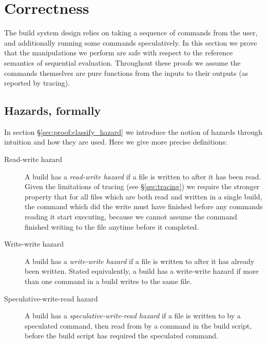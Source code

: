 
\renewcommand{\proof}{\vspace{1mm}\noindent \textbf{Proof}: }
\newcommand{\refutation}{\vspace{1mm}\noindent \textbf{Refutation}: }

\section{Correctness}
\label{sec:proof}

\newtheorem{claim}{Claim}

The build system design relies on taking a sequence of commands from the user, and additionally running some commands speculatively. In this section we prove that the manipulations we perform are safe with respect to the reference semantics of sequential evaluation. Throughout these proofs we assume the commands themselves are pure functions from the inputs to their outputs (as reported by tracing).

\subsection{Hazards, formally}
\label{sec:hazards_formally}

In section \S\ref{sec:proof:classify_hazard} we introduce the notion of hazards through intuition and how they are used. Here we give more precise definitions:

\begin{description}
\item[Read-write hazard] A build has a \emph{read-write hazard} if a file is written to after it has been read. Given the limitations of tracing (see \S\ref{sec:tracing}) we require the stronger property that for all files which are both read and written in a single build, the command which did the write must have finished before any commands reading it start executing, because we cannot assume the command finished writing to the file anytime before it completed.  %
\item[Write-write hazard] A build has a \emph{write-write hazard} if a file is written to after it has already been written. Stated equivalently, a build has a write-write hazard if more than one command in a build writes to the same file.
\item[Speculative-write-read hazard] A build has a \emph{speculative-write-read hazard} if a file is written to by a speculated command, then read from by a command in the build script, before the build script has required the speculated command.
\end{description}


